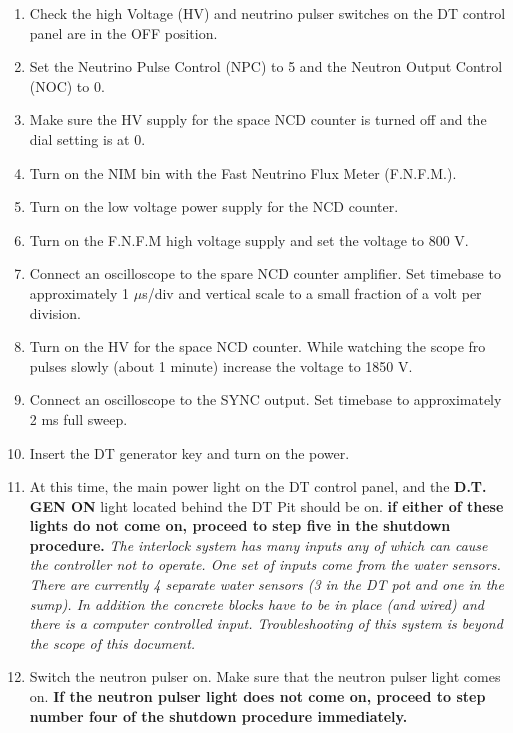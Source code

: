 \begin{enumerate}
\item \CheckBox[name=dttop8]{} Check the high Voltage (HV) and neutrino pulser switches on the DT control panel are in the OFF position.
\item \CheckBox[name=dttop9]{} Set the Neutrino Pulse Control (NPC) to 5 and the Neutron Output Control (NOC) to 0.
\item \CheckBox[name=dttop10]{} Make sure the HV supply for the space NCD counter is turned off and the dial setting is at 0.
\item \CheckBox[name=dttop11]{} Turn on the NIM bin with the Fast Neutrino Flux Meter (F.N.F.M.).
\item \CheckBox[name=dttop12]{} Turn on the low voltage power supply for the NCD counter.
\item \CheckBox[name=dttop13]{} Turn on the F.N.F.M high voltage supply and set the voltage to 800 V.
\item \CheckBox[name=dttop14]{} Connect an oscilloscope to the spare NCD counter amplifier. Set timebase to approximately 1 $\mu$s/div and vertical scale to a small fraction of a volt per division.
\item \CheckBox[name=dttop15]{} Turn on the HV for the space NCD counter. While watching the scope fro pulses slowly (about 1 minute) increase the voltage to 1850 V.
\item \CheckBox[name=dttop16]{} Connect an oscilloscope to the SYNC output. Set timebase to approximately 2 ms full sweep.
\item \CheckBox[name=dttop17]{} Insert the DT generator key and turn on the power.
\item \CheckBox[name=dttop18]{} At this time, the main power light on the DT control panel, and the {\bf D.T. GEN ON} light located behind the DT Pit should be on. {\bf if either of these lights do not come on, proceed to step five in the shutdown procedure.} {\it The interlock system has many inputs any of which can cause the controller not to operate. One set of inputs come from the water sensors. There are currently 4 separate water sensors (3 in the DT pot and one in the sump). In addition the concrete blocks have to be in place (and wired) and there is a computer controlled input. Troubleshooting of this system is beyond the scope of this document.}
\item \CheckBox[name=dttop19]{} Switch the neutron pulser on. Make sure that the neutron pulser light comes on. {\bf If the neutron pulser light does not come on, proceed to step number four of the shutdown procedure immediately.}

\end{enumerate}

